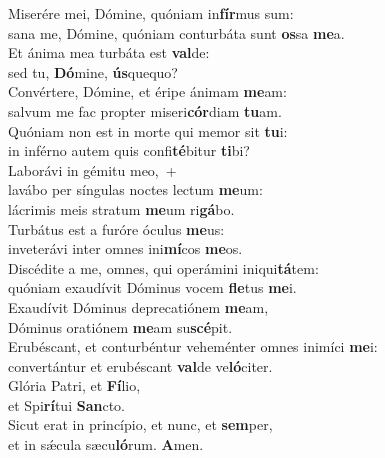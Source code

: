 \evenverse Miserére mei, Dómine, quóniam in\textbf{fír}mus sum:~\*\\
\evenverse sana me, Dómine, quóniam conturbáta sunt \textbf{os}sa \textbf{me}a.\\
\oddverse Et ánima mea turbáta est \textbf{val}de:~\*\\
\oddverse sed tu, \textbf{Dó}mine, \textbf{ús}quequo?\\
\evenverse Convértere, Dómine, et éripe ánimam \textbf{me}am:~\*\\
\evenverse salvum me fac propter miseri\textbf{cór}diam \textbf{tu}am.\\
\oddverse Quóniam non est in morte qui memor sit \textbf{tu}i:~\*\\
\oddverse in inférno autem quis confi\textbf{té}bitur \textbf{ti}bi?\\
\evenverse Laborávi in gémitu meo,~+\\
\evenverse  lavábo per síngulas noctes lectum \textbf{me}um:~\*\\
\evenverse lácrimis meis stratum \textbf{me}um ri\textbf{gá}bo.\\
\oddverse Turbátus est a furóre óculus \textbf{me}us:~\*\\
\oddverse inveterávi inter omnes ini\textbf{mí}cos \textbf{me}os.\\
\evenverse Discédite a me, omnes, qui operámini iniqui\textbf{tá}tem:~\*\\
\evenverse quóniam exaudívit Dóminus vocem \textbf{fle}tus \textbf{me}i.\\
\oddverse Exaudívit Dóminus deprecatiónem \textbf{me}am,~\*\\
\oddverse Dóminus oratiónem \textbf{me}am su\textbf{scé}pit.\\
\evenverse Erubéscant, et conturbéntur veheménter omnes inimíci \textbf{me}i:~\*\\
\evenverse convertántur et erubéscant \textbf{val}de ve\textbf{ló}citer.\\
\oddverse Glória Patri, et \textbf{Fí}lio,~\*\\
\oddverse et Spi\textbf{rí}tui \textbf{San}cto.\\
\evenverse Sicut erat in princípio, et nunc, et \textbf{sem}per,~\*\\
\evenverse et in sǽcula sæcu\textbf{ló}rum. \textbf{A}men.\\
